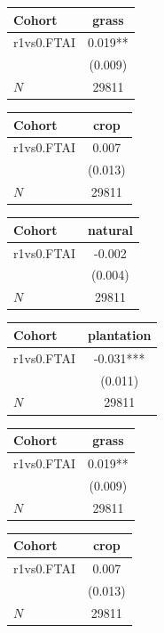 {
\def\sym#1{\ifmmode^{#1}\else\(^{#1}\)\fi}
\begin{tabular}{l*{1}{c}}
\toprule
Cohort    &    grass   \\
\midrule
r1vs0.FTAI&    0.019** \\
          &  (0.009)   \\
\midrule
\(N\)     &    29811   \\
\bottomrule
\end{tabular}
}
{
\def\sym#1{\ifmmode^{#1}\else\(^{#1}\)\fi}
\begin{tabular}{l*{1}{c}}
\toprule
Cohort    &     crop   \\
\midrule
r1vs0.FTAI&    0.007   \\
          &  (0.013)   \\
\midrule
\(N\)     &    29811   \\
\bottomrule
\end{tabular}
}
{
\def\sym#1{\ifmmode^{#1}\else\(^{#1}\)\fi}
\begin{tabular}{l*{1}{c}}
\toprule
Cohort    &  natural   \\
\midrule
r1vs0.FTAI&   -0.002   \\
          &  (0.004)   \\
\midrule
\(N\)     &    29811   \\
\bottomrule
\end{tabular}
}
{
\def\sym#1{\ifmmode^{#1}\else\(^{#1}\)\fi}
\begin{tabular}{l*{1}{c}}
\toprule
Cohort    &plantation   \\
\midrule
r1vs0.FTAI&   -0.031***\\
          &  (0.011)   \\
\midrule
\(N\)     &    29811   \\
\bottomrule
\end{tabular}
}
{
\def\sym#1{\ifmmode^{#1}\else\(^{#1}\)\fi}
\begin{tabular}{l*{1}{c}}
\toprule
Cohort    &    grass   \\
\midrule
r1vs0.FTAI&    0.019** \\
          &  (0.009)   \\
\midrule
\(N\)     &    29811   \\
\bottomrule
\end{tabular}
}
{
\def\sym#1{\ifmmode^{#1}\else\(^{#1}\)\fi}
\begin{tabular}{l*{1}{c}}
\toprule
Cohort    &     crop   \\
\midrule
r1vs0.FTAI&    0.007   \\
          &  (0.013)   \\
\midrule
\(N\)     &    29811   \\
\bottomrule
\end{tabular}
}
